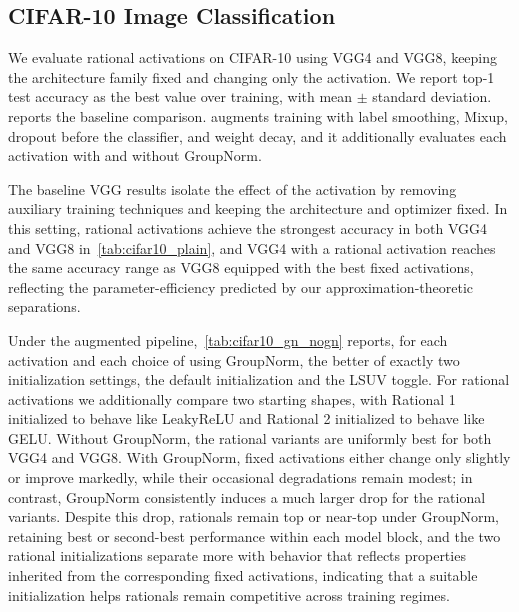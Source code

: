 \documentclass{article}
\theoremstyle{plain}
\theoremstyle{definition}
\theoremstyle{remark}
\begin{document}
\subsection{CIFAR-10 Image Classification}

We evaluate rational activations on CIFAR-10 \cite{krizhevsky2009learning} using VGG4 and VGG8, keeping the architecture family fixed and changing only the activation. We report top-1 test accuracy as the best value over training, with mean $\pm$ standard deviation.  reports the baseline comparison.  augments training with label smoothing, Mixup, dropout before the classifier, and weight decay, and it additionally evaluates each activation with and without GroupNorm.

The baseline VGG results isolate the effect of the activation by removing auxiliary training techniques and keeping the architecture and optimizer fixed. In this setting, rational activations achieve the strongest accuracy in both VGG4 and VGG8 in~\cref{tab:cifar10_plain}, and VGG4 with a rational activation reaches the same accuracy range as VGG8 equipped with the best fixed activations, reflecting the parameter-efficiency predicted by our approximation-theoretic separations.

Under the augmented pipeline,~\cref{tab:cifar10_gn_nogn} reports, for each activation and each choice of using GroupNorm, the better of exactly two initialization settings, the default initialization and the LSUV toggle. For rational activations we additionally compare two starting shapes, with Rational 1 initialized to behave like LeakyReLU and Rational 2 initialized to behave like GELU. Without GroupNorm, the rational variants are uniformly best for both VGG4 and VGG8. With GroupNorm, fixed activations either change only slightly or improve markedly, while their occasional degradations remain modest; in contrast, GroupNorm consistently induces a much larger drop for the rational variants. Despite this drop, rationals remain top or near-top under GroupNorm, retaining best or second-best performance within each model block, and the two rational initializations separate more with behavior that reflects properties inherited from the corresponding fixed activations, indicating that a suitable initialization helps rationals remain competitive across training regimes.
\end{document}
